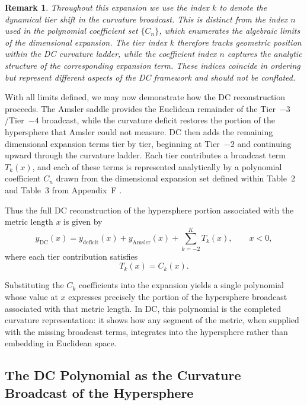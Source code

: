 \documentclass[final,onefignum,onetabnum]{siamart}
\newtheorem{remark}{Remark}
\begin{document}
\begin{remark}
Throughout this expansion we use the index $k$ to denote the dynamical tier shift in the curvature broadcast. This is distinct from the index $n$ used in the polynomial coefficient set $\{C_n\}$, which enumerates the algebraic limits of the dimensional expansion. The tier index $k$ therefore tracks geometric position within the DC curvature ladder, while the coefficient index $n$ captures the analytic structure of the corresponding expansion term. These indices coincide in ordering but represent different aspects of the DC framework and should not be conflated.
\end{remark}

With all limits defined, we may now demonstrate how the DC reconstruction proceeds. The Amsler saddle provides the Euclidean remainder of the Tier~$-3$/Tier~$-4$ broadcast, while the curvature deficit restores the portion of the hypersphere that Amsler could not measure. DC then adds the remaining dimensional expansion terms tier by tier, beginning at Tier~$-2$ and continuing upward through the curvature ladder. Each tier contributes a broadcast term $T_k(x)$, and each of these terms is represented analytically by a polynomial coefficient $C_n$ drawn from the dimensional expansion set defined within Table~2 and Table~3 from Appendix~F .

Thus the full DC reconstruction of the hypersphere portion associated with the metric length $x$ is given by
\begin{equation}
    y_{\mathrm{DC}}(x)
    = y_{\mathrm{deficit}}(x)
    + y_{\mathrm{Amsler}}(x)
    + \sum_{k=-2}^{K} T_k(x),
    \qquad x<0,
\end{equation}
where each tier contribution satisfies
\begin{equation}
    T_k(x) = C_k(x).
\end{equation}

Substituting the $C_k$ coefficients into the expansion yields a single polynomial whose value at $x$ expresses precisely the portion of the hypersphere broadcast associated with that metric length. In DC, this polynomial is the completed curvature representation: it shows how any segment of the metric, when supplied with the missing broadcast terms, integrates into the hypersphere rather than embedding in Euclidean space.

\subsection{The DC Polynomial as the Curvature Broadcast of the Hypersphere}
\end{document}
